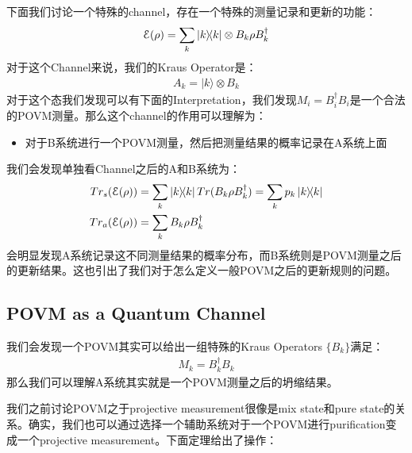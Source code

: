 \bigskip
{}

下面我们讨论一个特殊的channel，存在一个特殊的测量记录和更新的功能：
\begin{align}
  \mathcal{E}(\rho) = \sum_k \left| k \middle\rangle\!\middle\langle k \right| \otimes B_k \rho B_k^\dagger
\end{align}
对于这个Channel来说，我们的Kraus Operator是：
\begin{align}
  A_k=|k\rangle\otimes B_k
\end{align}
对于这个态我们发现可以有下面的Interpretation，我们发现$ M_i = B_i^\dagger B_i $是一个合法的POVM测量。那么这个channel的作用可以理解为：
\begin{itemize}
  \item 对于B系统进行一个POVM测量，然后把测量结果的概率记录在A系统上面
\end{itemize}
我们会发现单独看Channel之后的A和B系统为：
\begin{align}
  Tr_s(\mathcal{E}(\rho)) &= \sum_k \left| k \middle\rangle\!\middle\langle k \right| Tr(B_k \rho B_k^\dagger) = \sum_k p_k \left| k \middle\rangle\!\middle\langle k \right|\\ 
  Tr_a(\mathcal{E}(\rho)) &= \sum_k B_k \rho B_k^\dagger
\end{align}
会明显发现A系统记录这不同测量结果的概率分布，而B系统则是POVM测量之后的更新结果。这也引出了我们对于怎么定义一般POVM之后的更新规则的问题。

\subsection{POVM as a Quantum Channel}

\bigskip
{}

我们会发现一个POVM其实可以给出一组特殊的Kraus Operators $ \{ B_k \} $满足：
\begin{align}
  M_k = B_k^\dagger B_k
\end{align}
那么我们可以理解A系统其实就是一个POVM测量之后的坍缩结果。

\bigskip
{}

我们之前讨论POVM之于projective measurement很像是mix state和pure state的关系。确实，我们也可以通过选择一个辅助系统对于一个POVM进行purification变成一个projective measurement。下面定理给出了操作：

